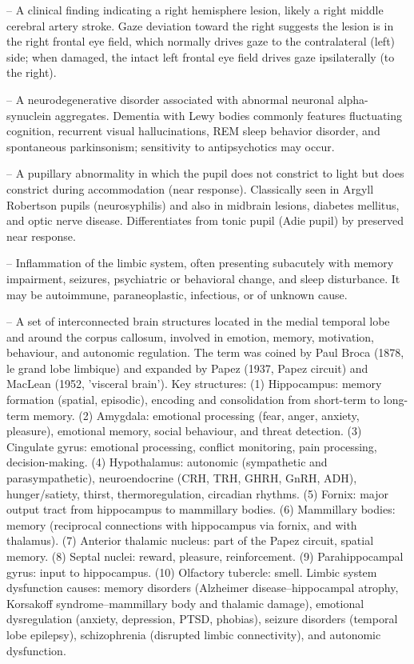 -- A clinical finding indicating a right hemisphere lesion, likely a right middle cerebral artery stroke. Gaze deviation toward the right suggests the lesion is in the right frontal eye field, which normally drives gaze to the contralateral (left) side; when damaged, the intact left frontal eye field drives gaze ipsilaterally (to the right).

-- A neurodegenerative disorder associated with abnormal neuronal alpha-synuclein aggregates. Dementia with Lewy bodies commonly features fluctuating cognition, recurrent visual hallucinations, REM sleep behavior disorder, and spontaneous parkinsonism; sensitivity to antipsychotics may occur.

-- A pupillary abnormality in which the pupil does not constrict to light but does constrict during accommodation (near response). Classically seen in Argyll Robertson pupils (neurosyphilis) and also in midbrain lesions, diabetes mellitus, and optic nerve disease. Differentiates from tonic pupil (Adie pupil) by preserved near response.

-- Inflammation of the limbic system, often presenting subacutely with memory impairment, seizures, psychiatric or behavioral change, and sleep disturbance. It may be autoimmune, paraneoplastic, infectious, or of unknown cause.

-- A set of interconnected brain structures located in the medial temporal lobe and around the corpus callosum, involved in emotion, memory, motivation, behaviour, and autonomic regulation. The term was coined by Paul Broca (1878, le grand lobe limbique) and expanded by Papez (1937, Papez circuit) and MacLean (1952, 'visceral brain'). Key structures: (1) Hippocampus: memory formation (spatial, episodic), encoding and consolidation from short-term to long-term memory. (2) Amygdala: emotional processing (fear, anger, anxiety, pleasure), emotional memory, social behaviour, and threat detection. (3) Cingulate gyrus: emotional processing, conflict monitoring, pain processing, decision-making. (4) Hypothalamus: autonomic (sympathetic and parasympathetic), neuroendocrine (CRH, TRH, GHRH, GnRH, ADH), hunger/satiety, thirst, thermoregulation, circadian rhythms. (5) Fornix: major output tract from hippocampus to mammillary bodies. (6) Mammillary bodies: memory (reciprocal connections with hippocampus via fornix, and with thalamus). (7) Anterior thalamic nucleus: part of the Papez circuit, spatial memory. (8) Septal nuclei: reward, pleasure, reinforcement. (9) Parahippocampal gyrus: input to hippocampus. (10) Olfactory tubercle: smell. Limbic system dysfunction causes: memory disorders (Alzheimer disease--hippocampal atrophy, Korsakoff syndrome--mammillary body and thalamic damage), emotional dysregulation (anxiety, depression, PTSD, phobias), seizure disorders (temporal lobe epilepsy), schizophrenia (disrupted limbic connectivity), and autonomic dysfunction.

